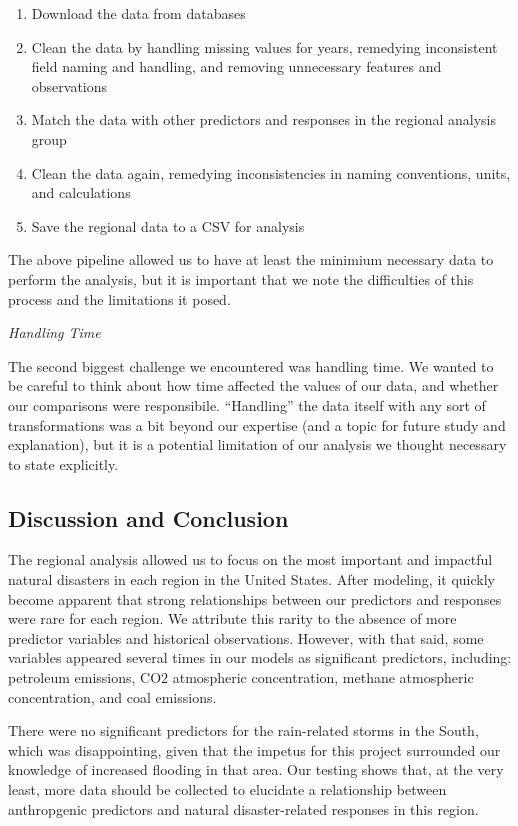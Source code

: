 \documentclass[10pt,]{article}
\begin{document}
\begin{enumerate}
  \item Download the data from databases
  \item Clean the data by handling missing values for years, remedying inconsistent field naming and handling, and removing unnecessary features and observations
  \item Match the data with other predictors and responses in the regional analysis group
  \item Clean the data again, remedying inconsistencies in naming conventions, units, and calculations
  \item Save the regional data to a CSV for analysis
\end{enumerate}

The above pipeline allowed us to have at least the minimium necessary
data to perform the analysis, but it is important that we note the
difficulties of this process and the limitations it posed.

\textit{Handling Time}

The second biggest challenge we encountered was handling time. We wanted
to be careful to think about how time affected the values of our data,
and whether our comparisons were responsibile. ``Handling'' the data
itself with any sort of transformations was a bit beyond our expertise
(and a topic for future study and explanation), but it is a potential
limitation of our analysis we thought necessary to state explicitly.

\subsection{Discussion and Conclusion}\label{discussion-and-conclusion}

The regional analysis allowed us to focus on the most important and
impactful natural disasters in each region in the United States. After
modeling, it quickly become apparent that strong relationships between
our predictors and responses were rare for each region. We attribute
this rarity to the absence of more predictor variables and historical
observations. However, with that said, some variables appeared several
times in our models as significant predictors, including: petroleum
emissions, CO\(2\) atmospheric concentration, methane atmospheric
concentration, and coal emissions.

There were no significant predictors for the rain-related storms in the
South, which was disappointing, given that the impetus for this project
surrounded our knowledge of increased flooding in that area. Our testing
shows that, at the very least, more data should be collected to
elucidate a relationship between anthropgenic predictors and natural
disaster-related responses in this region.
\end{document}
